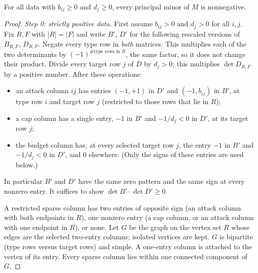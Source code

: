 \begin{lemma}[$P_0$]\label{app-dl:lem:p0}
\statuslean
For all data with $b_{ij}\ge0$ and $d_j\ge0$, every principal minor of $M$ is nonnegative.
\end{lemma}

\begin{proof}
\emph{Step 0: strictly positive data.} First assume $b_{ij}>0$ and $d_j>0$ for all $i,j$. Fix $R,F$ with
$|R|=|F|$ and write $B'$, $D'$ for the following rescaled versions of $B_{R,F}$, $D_{R,F}$. Negate every
type row in \emph{both} matrices. This multiplies each of the two determinants by $(-1)^{\#\text{type
rows in }R}$, the same factor, so it does not change their product. Divide every target row $j$ of $D$
by $d_j>0$; this multiplies $\det D_{R,F}$ by a positive number. After these operations:
\begin{itemize}[nosep]
  \item an attack column $ij$ has entries $(-1,+1)$ in $D'$ and $(-1,b_{ij})$ in $B'$, at type row $i$
        and target row $j$ (restricted to those rows that lie in $R$);
  \item a cap column has a single entry, $-1$ in $B'$ and $-1/d_j<0$ in $D'$, at its target row $j$;
  \item the budget column has, at every selected target row $j$, the entry $-1$ in $B'$ and $-1/d_j<0$ in
        $D'$, and $0$ elsewhere. (Only the signs of these entries are used below.)
\end{itemize}
In particular $B'$ and $D'$ have the same zero pattern and the same sign at every nonzero entry. It
suffices to show $\det B'\cdot\det D'\ge0$.

A restricted sparse column has two entries of opposite sign (an attack column with both endpoints in
$R$), one nonzero entry (a cap column, or an attack column with one endpoint in $R$), or none. Let $G$ be
the graph on the vertex set $R$ whose edges are the selected two-entry columns; isolated vertices are
kept. $G$ is bipartite (type rows versus target rows) and simple. A one-entry column is attached to the
vertex of its entry. Every sparse column lies within one connected component of $G$.


\end{proof}
